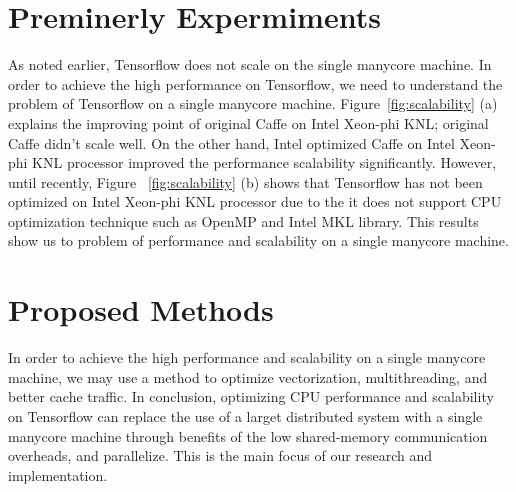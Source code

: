 \documentclass{IOS-Book-Article}
\begin{document}
\section{Preminerly Expermiments}
As noted earlier, Tensorflow does not scale on the single manycore machine. 
In order to achieve the high performance on Tensorflow, we need to understand
the problem of Tensorflow on a single manycore machine. 
Figure~\ref{fig:scalability} (a) explains the improving point of
original Caffe on Intel Xeon-phi KNL; original Caffe didn’t scale well. 
On the other hand, Intel optimized Caffe on Intel Xeon-phi KNL processor 
improved the performance scalability significantly.
However, until recently, Figure ~\ref{fig:scalability} (b) shows that Tensorflow
has not been optimized on Intel Xeon-phi KNL processor due to the it does not
support CPU optimization technique such as OpenMP and Intel MKL library.
This results show us to problem of performance and scalability on a single
manycore machine.

\section{Proposed Methods}
In order to achieve the high performance and scalability on a single manycore
machine, we may use a method to optimize vectorization, multithreading, and
better cache traffic.
In conclusion, optimizing CPU performance and scalability on Tensorflow can
replace the use of a larget distributed system with a single manycore machine
through benefits of the low shared-memory communication overheads, and
parallelize.
This is the main focus of our research and implementation.



 




\end{document}

